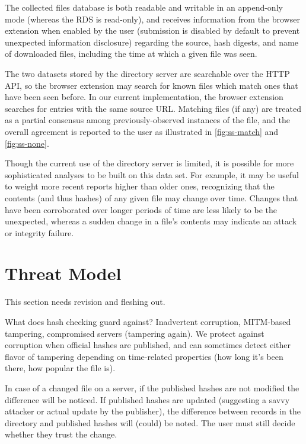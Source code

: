 \documentclass[letterpaper,twocolumn,10pt]{article}
\begin{document}
The collected files database is both readable and writable in an append-only mode
(whereas the RDS is read-only), and receives information from the browser extension
when enabled by the user (submission is disabled by default to prevent unexpected
information disclosure) regarding the source, hash digests, and name of downloaded
files, including the time at which a given file was seen.

The two datasets stored by the directory server are searchable over the HTTP
API, so the browser extension may search for known files which match ones
that have been seen before. In our current implementation, the browser extension
searches for entries with the same source URL. Matching files (if any) are
treated as a partial consensus among previously-observed instances of the file,
and the overall agreement is reported to the user as illustrated in \autoref{fig:ss-match}
and \autoref{fig:ss-none}.

Though the current use of the directory server is limited, it is possible for more
sophisticated analyses to be built on this data set. For example, it may be
useful to weight more recent reports higher than older ones, recognizing
that the contents (and thus hashes) of any given file may change over time.
Changes that have been corroborated over longer periods of time are less
likely to be the unexpected, whereas a sudden change in a file's contents may indicate
an attack or integrity failure.

\section{Threat Model}

This section needs revision and fleshing out.

What does hash checking guard against? Inadvertent corruption, MITM-based tampering, compromised servers (tampering again). We protect against corruption when official hashes are published, and can sometimes detect either flavor of tampering depending on time-related properties (how long it’s been there, how popular the file is).

In case of a changed file on a server, if the published hashes are not modified the difference will be noticed. If published hashes are updated (suggesting a savvy attacker or actual update by the publisher), the difference between records in the directory and published hashes will (could) be noted. The user must still decide whether they trust the change.
\end{document}
